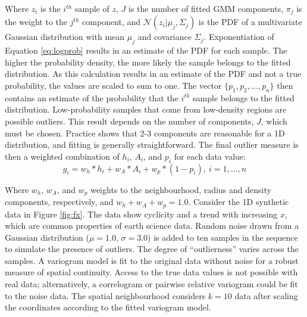 Where $z_{i}$ is the $i^{th}$ sample of $z$, $J$ is the number of fitted \gls{GMM} components, $\pi_{j}$ is the weight to the $j^{th}$ component, and $\mathcal{N}(z_{i}|\mu_{j}, \Sigma_{j})$ is the \gls{PDF} of a multivariate Gaussian distribution with mean $\mu_{j}$ and covariance $\Sigma_{j}$. Exponentiation of Equation \ref{eq:logprob} results in an estimate of the \gls{PDF} for each sample. The higher the probability density, the more likely the sample belongs to the fitted distribution. As this calculation results in an estimate of the \gls{PDF} and not a true probability, the values are scaled to sum to one. The vector $\{p_{1}, p_{2}, \dots, p_{n}\}$ then contains an estimate of the probability that the $i^{th}$ sample belongs to the fitted distribution. Low-probability samples that come from low-density regions are possible outliers. This result depends on the number of components, $J$, which must be chosen. Practice shows that 2-3 components are reasonable for a \gls{1D} distribution, and fitting is generally straightforward. The final outlier measure is then a weighted combination of $h_{i}$, $A_{i}$, and $p_{i}$ for each data value:
\begin{equation}
    g_{i} = w_{h}*h_{i} + w_{A}*A_{i} + w_{p}*(1-p_{i}), \ i = 1, \dots, n
    \label{eq:outlier}
\end{equation}

Where $w_{h}$, $w_{A}$, and $w_{p}$ weights to the neighbourhood, radius and density components, respectively, and $w_{h}+w_{A}+w_{p}=1.0$. Consider the \gls{1D} synthetic data in Figure \ref{fig:fx}. The data show cyclicity and a trend with increasing $x$, which are common properties of earth science data. Random noise drawn from a Gaussian distribution ($\mu=1.0$, $\sigma=3.0$) is added to ten samples in the sequence to simulate the presence of outliers. The degree of ``outlierness'' varies across the samples. A variogram model is fit to the original data without noise for a robust measure of spatial continuity. Access to the true data values is not possible with real data; alternatively, a correlogram or pairwise relative variogram could be fit to the noise data. The spatial neighbourhood considers $k=10$ data after scaling the coordinates according to the fitted variogram model.

